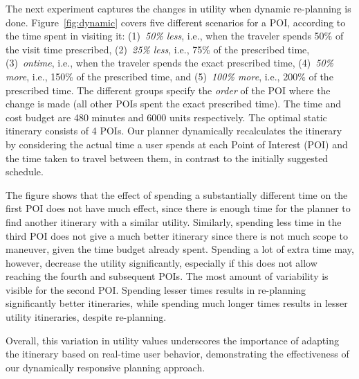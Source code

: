 
The next experiment captures the changes in utility when dynamic re-planning is done.
Figure~\ref{fig:dynamic} covers five different scenarios for a POI, according to the time spent in visiting it: (1)~\emph{50\% less}, i.e., when the traveler spends 50\% of the visit time prescribed, (2)~\emph{25\% less}, i.e., 75\% of the prescribed time, (3)~\emph{ontime}, i.e., when the traveler spends the exact prescribed time, (4)~\emph{50\% more}, i.e., 150\% of the prescribed time, and (5)~\emph{100\% more}, i.e., 200\% of the prescribed time.
The different groups specify the \emph{order} of the POI where the change is made (all other POIs spent the exact prescribed time).
The time and cost budget are 480 minutes and 6000 units respectively.
The optimal static itinerary consists of 4 POIs.
Our planner dynamically recalculates the itinerary by considering the actual time a user spends at each Point of Interest (POI) and the time taken to travel between them, in contrast to the initially suggested schedule.

The figure shows that the effect of spending a substantially different time on the first POI does not have much effect, since there is enough time for the planner to find another itinerary with a similar utility.
Similarly, spending less time in the third POI does not give a much better itinerary since there is not much scope to maneuver, given the time budget already spent. Spending a lot of extra time may, however, decrease the utility significantly, especially if this does not allow reaching the fourth and subsequent POIs.
The most amount of variability is visible for the second POI.
Spending lesser times results in re-planning significantly better itineraries, while spending much longer times results in lesser utility itineraries, despite re-planning.

Overall, this variation in utility values underscores the importance of adapting the itinerary based on real-time user behavior, demonstrating the effectiveness of our dynamically responsive planning approach.

